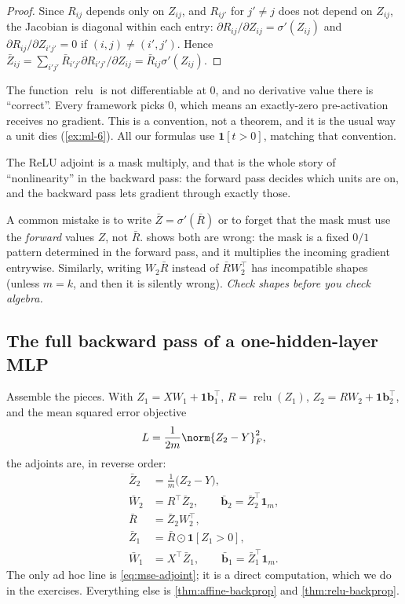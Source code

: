 \begin{proof}
Since $R_{ij}$ depends only on $Z_{ij}$, and $R_{ij'}$ for $j'\ne j$ does not
depend on $Z_{ij}$, the Jacobian is diagonal within each entry:
$\partial R_{ij}/\partial Z_{ij}=\sigma'(Z_{ij})$ and
$\partial R_{ij}/\partial Z_{i'j'}=0$ if $(i,j)\ne(i',j')$. Hence
$\bar Z_{ij}=\sum_{i'j'}\bar R_{i'j'}\partial R_{i'j'}/\partial Z_{ij}
=\bar R_{ij}\sigma'(Z_{ij})$.
\end{proof}

\begin{remark}
The function $\operatorname{relu}$ is not differentiable at $0$, and no
derivative value there is ``correct''. Every framework picks $0$, which means
an exactly-zero pre-activation receives no gradient. This is a convention, not a
theorem, and it is the usual way a unit dies (\cref{ex:ml-6}). All our formulas
use $\mathbf{1}[t>0]$, matching that convention.
\end{remark}

The ReLU adjoint is a mask multiply, and that is the whole story of
``nonlinearity'' in the backward pass: the forward pass decides which units are
on, and the backward pass lets gradient through exactly those.

\begin{example}
A common mistake is to write $\bar Z=\sigma'(\bar R)$ or to forget that the
mask must use the \emph{forward} values $Z$, not $\bar R$. 
shows both are wrong: the mask is a fixed $0/1$ pattern determined in the
forward pass, and it multiplies the incoming gradient entrywise. Similarly,
writing $W_2\bar R$ instead of $\bar R W_2^{\!\top}$ has incompatible shapes
(unless $m=k$, and then it is silently wrong). \emph{Check shapes before you
check algebra.}
\end{example}

\subsection{The full backward pass of a one-hidden-layer MLP}

Assemble the pieces. With $Z_1=XW_1+\mathbf{1}\mathbf{b}_1^{\!\top}$,
$R=\operatorname{relu}(Z_1)$, $Z_2=RW_2+\mathbf{1}\mathbf{b}_2^{\!\top}$, and the
mean squared error objective
\[
  L=\frac{1}{2m}\norm{Z_2-Y}_F^2,
\]
the adjoints are, in reverse order:
\begin{align}
  \bar Z_2 &= \frac{1}{m}\bigl(Z_2-Y\bigr),
  \label{eq:mse-adjoint}\\
  \bar W_2 &= R^{\!\top}\bar Z_2, \qquad \bar{\mathbf b}_2=\bar Z_2^{\!\top}\mathbf{1}_m, \label{eq:w2}\\
  \bar R &= \bar Z_2 W_2^{\!\top}, \label{eq:Rbar}\\
  \bar Z_1 &= \bar R\odot\mathbf{1}[Z_1>0], \label{eq:z1bar}\\
  \bar W_1 &= X^{\!\top}\bar Z_1, \qquad \bar{\mathbf b}_1=\bar Z_1^{\!\top}\mathbf{1}_m. \label{eq:w1}
\end{align}
The only ad hoc line is \eqref{eq:mse-adjoint}; it is a direct computation,
which we do in the exercises. Everything else is
\cref{thm:affine-backprop} and \cref{thm:relu-backprop}.

